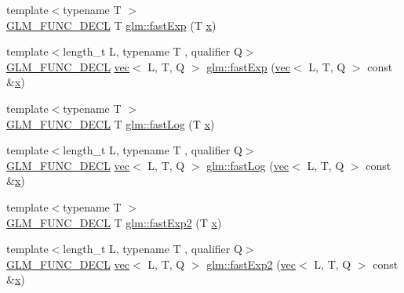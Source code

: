 \begin{DoxyCompactItemize}
\item 
{\footnotesize template$<$typename T $>$ }\\\mbox{\hyperlink{setup_8hpp_ab2d052de21a70539923e9bcbf6e83a51}{G\+L\+M\+\_\+\+F\+U\+N\+C\+\_\+\+D\+E\+CL}} T \mbox{\hyperlink{group__gtx__fast__exponential_gaa3180ac8f96ab37ab96e0cacaf608e10}{glm\+::fast\+Exp}} (T \mbox{\hyperlink{_s_d_l__opengl_8h_ad0e63d0edcdbd3d79554076bf309fd47}{x}})
\item 
{\footnotesize template$<$length\+\_\+t L, typename T , qualifier Q$>$ }\\\mbox{\hyperlink{setup_8hpp_ab2d052de21a70539923e9bcbf6e83a51}{G\+L\+M\+\_\+\+F\+U\+N\+C\+\_\+\+D\+E\+CL}} \mbox{\hyperlink{structglm_1_1vec}{vec}}$<$ L, T, Q $>$ \mbox{\hyperlink{group__gtx__fast__exponential_ga3ba6153aec6bd74628f8b00530aa8d58}{glm\+::fast\+Exp}} (\mbox{\hyperlink{structglm_1_1vec}{vec}}$<$ L, T, Q $>$ const \&\mbox{\hyperlink{_s_d_l__opengl_8h_ad0e63d0edcdbd3d79554076bf309fd47}{x}})
\item 
{\footnotesize template$<$typename T $>$ }\\\mbox{\hyperlink{setup_8hpp_ab2d052de21a70539923e9bcbf6e83a51}{G\+L\+M\+\_\+\+F\+U\+N\+C\+\_\+\+D\+E\+CL}} T \mbox{\hyperlink{group__gtx__fast__exponential_gae1bdc97b7f96a600e29c753f1cd4388a}{glm\+::fast\+Log}} (T \mbox{\hyperlink{_s_d_l__opengl_8h_ad0e63d0edcdbd3d79554076bf309fd47}{x}})
\item 
{\footnotesize template$<$length\+\_\+t L, typename T , qualifier Q$>$ }\\\mbox{\hyperlink{setup_8hpp_ab2d052de21a70539923e9bcbf6e83a51}{G\+L\+M\+\_\+\+F\+U\+N\+C\+\_\+\+D\+E\+CL}} \mbox{\hyperlink{structglm_1_1vec}{vec}}$<$ L, T, Q $>$ \mbox{\hyperlink{group__gtx__fast__exponential_ga937256993a7219e73f186bb348fe6be8}{glm\+::fast\+Log}} (\mbox{\hyperlink{structglm_1_1vec}{vec}}$<$ L, T, Q $>$ const \&\mbox{\hyperlink{_s_d_l__opengl_8h_ad0e63d0edcdbd3d79554076bf309fd47}{x}})
\item 
{\footnotesize template$<$typename T $>$ }\\\mbox{\hyperlink{setup_8hpp_ab2d052de21a70539923e9bcbf6e83a51}{G\+L\+M\+\_\+\+F\+U\+N\+C\+\_\+\+D\+E\+CL}} T \mbox{\hyperlink{group__gtx__fast__exponential_ga0af50585955eb14c60bb286297fabab2}{glm\+::fast\+Exp2}} (T \mbox{\hyperlink{_s_d_l__opengl_8h_ad0e63d0edcdbd3d79554076bf309fd47}{x}})
\item 
{\footnotesize template$<$length\+\_\+t L, typename T , qualifier Q$>$ }\\\mbox{\hyperlink{setup_8hpp_ab2d052de21a70539923e9bcbf6e83a51}{G\+L\+M\+\_\+\+F\+U\+N\+C\+\_\+\+D\+E\+CL}} \mbox{\hyperlink{structglm_1_1vec}{vec}}$<$ L, T, Q $>$ \mbox{\hyperlink{group__gtx__fast__exponential_gacaaed8b67d20d244b7de217e7816c1b6}{glm\+::fast\+Exp2}} (\mbox{\hyperlink{structglm_1_1vec}{vec}}$<$ L, T, Q $>$ const \&\mbox{\hyperlink{_s_d_l__opengl_8h_ad0e63d0edcdbd3d79554076bf309fd47}{x}})

\end{DoxyCompactItemize}
